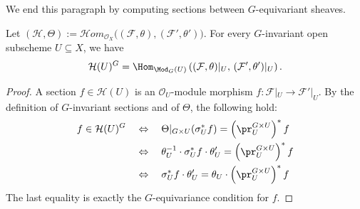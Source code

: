We end this paragraph by computing sections between $G$-equivariant sheaves.
\begin{prop}\label{prop:InvariantSectionsOfEquivariantInternalHom}
Let
$(\mathcal H,\Theta)
:=
\mathcal Hom_{\mathcal O_X}
\bigl((\mathcal F,\theta),(\mathcal F',\theta')\bigr)$.
For every $G$-invariant open subscheme $U\subseteq X$,
we have
$$
\mathcal H(U)^G
=
\Hom_{\Mod_G(U)}
\left(
(\mathcal F,\theta)|_U,\,
(\mathcal F',\theta')|_U
\right).
$$
\end{prop}

\begin{proof}
A section $f\in\mathcal H(U)$ is an $\mathcal O_U$-module
morphism $f:\mathcal F|_U\rightarrow\mathcal F'|_U$.
By the definition of $G$-invariant sections and of $\Theta$,
the following hold:
\begin{align*}
f\in\mathcal H(U)^G
&\quad\Leftrightarrow\quad
\Theta|_{G\times U}(\sigma_U^*f)
=
\left(\pr_U^{G\times U}\right)^*f
\\
&\quad\Leftrightarrow\quad
\theta_U^{-1}\cdot\sigma_U^*f\cdot\theta'_U
=
\left(\pr_U^{G\times U}\right)^*f
\\
&\quad\Leftrightarrow\quad
\sigma_U^*f\cdot\theta'_U
=
\theta_U\cdot
\left(\pr_U^{G\times U}\right)^*f
\end{align*}
The last equality is exactly the $G$-equivariance condition
for $f$.
\end{proof}





